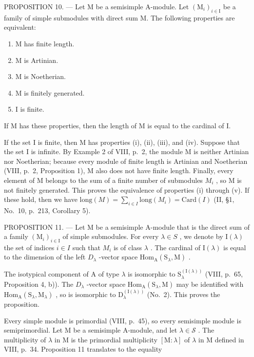 PROPOSITION 10. --- Let M be a semisimple A-module. Let \((\mathrm{M}_{i})_{i\in\mathrm{I}}\) be a family of simple submodules with direct sum M. The following properties are equivalent:

\begin{enumerate}
\def\labelenumi{(\roman{enumi})}
\item
  M has finite length.
\item
  M is Artinian.
\item
  M is Noetherian.
\item
  M is finitely generated.
\item
  I is finite.
\end{enumerate}

If M has these properties, then the length of M is equal to the cardinal of I.

If the set I is finite, then M has properties (i), (ii), (iii), and (iv). Suppose that the set I is infinite. By Example 2 of VIII, p.~2, the module M is neither Artinian nor Noetherian; because every module of finite length is Artinian and Noetherian (VIII, p.~2, Proposition 1), M also does not have finite length. Finally, every element of M belongs to the sum of a finite number of submodules \(M_{i}\) , so M is not finitely generated. This proves the equivalence of properties (i) through (v). If these hold, then we have \(\text{long}(M) = \sum_{i \in I} \text{long}(M_{i}) = \text{Card}(I)\) (II, §1, No.~10, p.~213, Corollary 5).

PROPOSITION 11. --- Let M be a semisimple A-module that is the direct sum of a family \((\mathrm{M}_{i})_{i\in\mathrm{I}}\) of simple submodules. For every \(\lambda\in S\) , we denote by \(\mathrm{I}(\lambda)\) the set of indices \(i\in I\) such that \(M_{i}\) is of class \(\lambda\) . The cardinal of \(\mathrm{I}(\lambda)\) is equal to the dimension of the left \(D_{\lambda}\) -vector space \(\mathrm{Hom}_{\mathrm{A}}(\mathrm{S}_{\lambda},\mathrm{M})\) .

The isotypical component of A of type \(\lambda\) is isomorphic to \(\mathrm{S}_{\lambda}^{(\mathrm{I}(\lambda))}\) (VIII, p.~65, Proposition 4, b)). The \(D_{\lambda}\) -vector space \(\mathrm{Hom}_{\mathrm{A}}(\mathrm{S}_{\lambda},\mathrm{M})\) may be identified with \(\mathrm{Hom}_{\mathrm{A}}(\mathrm{S}_{\lambda},\mathrm{M}_{\lambda})\) , so is isomorphic to \(\mathrm{D}_{\lambda}^{(\mathrm{I}(\lambda))}\) (No.~2). This proves the proposition.

Every simple module is primordial (VIII, p.~45), so every semisimple module is semiprimordial. Let M be a semisimple A-module, and let \(\lambda \in \mathcal{S}\) . The multiplicity of \(\lambda\) in M is the primordial multiplicity \([\mathrm{M}:\lambda]\) of \(\lambda\) in M defined in VIII, p.~34. Proposition 11 translates to the equality

